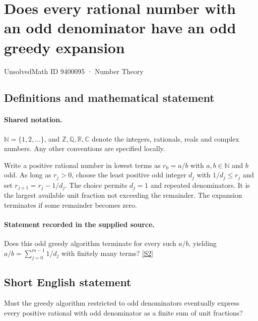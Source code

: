 \documentclass[11pt]{article}
\newcommand{\sref}[2]{\hyperlink{source:#1:#2}{[S#2]}}
\begin{document}
\setcounter{section}{9400094}
\section{Does every rational number with an odd denominator have an odd greedy expansion}\label{9400095}
{\small\sffamily UnsolvedMath ID 9400095 · Number Theory}
\subsection{Definitions and mathematical statement}

\paragraph{Shared notation.}$\mathbb N=\{1,2,\ldots\}$, and $\mathbb Z,\mathbb Q,\mathbb R,\mathbb C$ denote the integers, rationals, reals and complex numbers. Any other conventions are specified locally.


Write a positive rational number in lowest terms as $r_0=a/b$ with $a,b\in\mathbb N$ and $b$ odd. As long as $r_j>0$, choose the least positive odd integer $d_j$ with $1/d_j\le r_j$ and set $r_{j+1}=r_j-1/d_j$. The choice permits $d_j=1$ and repeated denominators. It is the largest available unit fraction not exceeding the remainder. The expansion terminates if some remainder becomes zero.
\paragraph{Statement recorded in the supplied source.}
Does this odd greedy algorithm terminate for every such $a/b$, yielding $a/b=\sum_{j=0}^{m-1}1/d_j$ with finitely many terms? \sref{9400095}{2}
\subsection{Short English statement}
Must the greedy algorithm restricted to odd denominators eventually express every positive rational with odd denominator as a finite sum of unit fractions?
\end{document}
